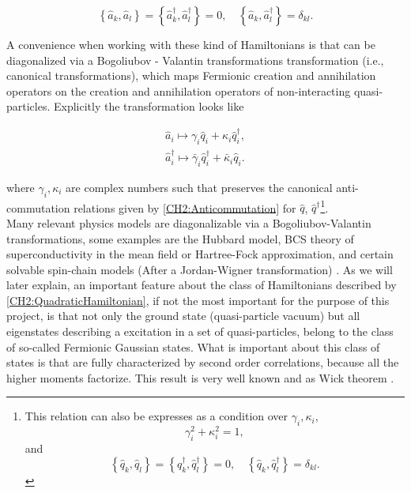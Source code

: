\begin{equation}
\left\{\hat{a}_{k}, \hat{a}_{l}\right\}=\left\{\hat{a}_{k}^{\dagger}, \hat{a}_{l}^{\dagger}\right\}=0, \quad\left\{\hat{a}_{k}, \hat{a}_{l}^{\dagger}\right\}=\delta_{k l}.
\label{CH2:Anticommutation}
\end{equation}

\indent A convenience when working with these kind of Hamiltonians is that can be diagonalized via a Bogoliubov - Valantin transformations transformation (i.e., canonical transformations), which maps Fermionic creation and annihilation operators on the creation and annihilation operators of non-interacting quasi-particles\cite{berezin_method_1966,bogoljubov_new_1958}. Explicitly the transformation looks like

\begin{equation}
\begin{array}{c}
\hat{a}_{i} \mapsto \gamma_{i} \hat{q}_{i}+\kappa_{i} \hat{q}_{i}^{\dagger}, \\
\hat{a}_{i}^{\dagger} \mapsto \bar{\gamma}_{i} \hat{q}_{i}^{\dagger}+\bar{\kappa}_{i} \hat{q}_{i}.
\end{array}
\label{CH2:Bogoliuvov}
\end{equation}

where $\gamma_i , \kappa_i$ are complex numbers such that preserves the canonical anti-commutation relations given by \eqref{CH2:Anticommutation} for $\hat{q}$, $\hat{q}^{\dagger}$\footnote{This relation can also be expresses as a condition over $\gamma_i , \kappa_i$,
\[ \gamma_i ^2+ \kappa_i^2 = 1,\]
and 
\[\left\{\hat{q}_{k}, \hat{q}_{l}\right\}=\left\{\hat{q}_{k}^{\dagger}, \hat{q}_{l}^{\dagger}\right\}=0, \quad\left\{\hat{q}_{k}, \hat{q}_{l}^{\dagger}\right\}=\delta_{k l}.\]
 }.\\

\indent Many relevant physics models are diagonalizable via a Bogoliubov-Valantin transformations, some examples are the Hubbard model, BCS theory of superconductivity in the mean field or Hartree-Fock approximation, and certain solvable spin-chain models (After a Jordan-Wigner transformation) \cite{fradkin_field_1997}. As we will later explain, an important feature about the class of Hamiltonians described by \eqref{CH2:QuadraticHamiltonian}, if not the most important for the purpose of this project,  is that not only the ground state (quasi-particle vacuum)  but all eigenstates describing a excitation  in a set of quasi-particles, belong to the class of so-called Fermionic Gaussian states\cite{botero_bcs-like_2004}. What is important about this class of states is that are fully characterized by second order correlations, because all the higher moments factorize. This result is very well known and as Wick theorem \cite{westwanski_general_1973,molinari_notes_2017}.
